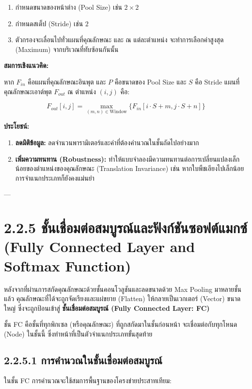 \documentclass[11pt,a4paper,openany]{report}
\begin{document}
\begin{enumerate}
  \item กำหนดขนาดของหน้าต่าง (Pool Size) เช่น $2 \times 2$
  \item กำหนดสเต็ป (Stride) เช่น $2$
  \item ตัวกรองจะเลื่อนไปทั่วแผนที่คุณลักษณะ และ ณ แต่ละตำแหน่ง จะทำการเลือกค่าสูงสุด (Maximum) จากบริเวณที่ทับซ้อนกันนั้น
\end{enumerate}


\textbf{สมการเชิงแนวคิด:}

หาก $F_{in}$ คือแผนที่คุณลักษณะอินพุต และ $P$ คือขนาดของ Pool Size และ $S$ คือ Stride แผนที่คุณลักษณะเอาต์พุต $F_{out}$ ณ ตำแหน่ง $(i, j)$ คือ:

$$F_{out}[i, j] = \max_{(m, n) \in \text{Window}} \{ F_{in}[i \cdot S + m, j \cdot S + n] \}$$


\textbf{ประโยชน์:}

\begin{enumerate}
  \item \textbf{ลดมิติข้อมูล:} ลดจำนวนพารามิเตอร์และค่าที่ต้องคำนวณในชั้นถัดไปอย่างมาก
  \item \textbf{เพิ่มความทนทาน (Robustness):} ทำให้แบบจำลองมีความทนทานต่อการเปลี่ยนแปลงเล็กน้อยของตำแหน่งของคุณลักษณะ (Translation Invariance) เช่น หากใบพืชเอียงไปเล็กน้อย การจำแนกประเภทก็ยังคงแม่นยำ
\end{enumerate}


---

\section{2.2.5 ชั้นเชื่อมต่อสมบูรณ์และฟังก์ชันซอฟต์แมกซ์ (Fully Connected Layer and Softmax Function)}


หลังจากที่ผ่านการสกัดคุณลักษณะด้วยชั้นคอนโวลูชันและลดขนาดด้วย Max Pooling มาหลายชั้นแล้ว คุณลักษณะที่ได้จะถูกจัดเรียงและแผ่ขยาย (Flatten) ให้กลายเป็นเวกเตอร์ (Vector) ขนาดใหญ่ ซึ่งจะถูกป้อนเข้าสู่ \textbf{ชั้นเชื่อมต่อสมบูรณ์ (Fully Connected Layer: FC)}

ชั้น FC คือชั้นที่ทุกพิกเซล (หรือคุณลักษณะ) ที่ถูกสกัดมาในชั้นก่อนหน้า จะเชื่อมต่อกับทุกโหนด (Node) ในชั้นนี้ ซึ่งทำหน้าที่เป็นตัวจำแนกประเภทขั้นสุดท้าย

\subsection{2.2.5.1 การคำนวณในชั้นเชื่อมต่อสมบูรณ์}


ในชั้น FC การคำนวณจะใช้สมการพื้นฐานของโครงข่ายประสาทเทียม:
\end{document}
